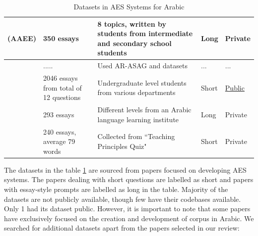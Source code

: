 \documentclass{article}
\begin{document}
\begin{table}
\begin{tabularx}{7in}{|c|X|p{1.5in}|p{1cm}|p{1.5cm}|}
			\textcite{20_azmi2019aaee} (AAEE) & 350 essays & 8 topics, written by students from intermediate and secondary school students & Long & Private \\ \hline
			\textcite{22_meccawy2023mining} & ..... & Used AR-ASAG \cite{ouahrani2020ar-asag} and \textcite{16_rababah2017short} datasets & ... & ... \\ \hline
			\textcite{23_ghazawi2024bert} & 2046 essays from total of 12 questions & Undergraduate level students from various departments & Short & \href{https://osf.io/dp2nh/?view_only=4ac6373c60214ea6952855f81507fec7}{Public} \\ \hline
			\textcite{26_alsanie2022threelevels} & 293 essays & Different levels from an Arabic language learning institute & Long & Private \\ \hline
			\textcite{27_gaheen2021jaya} & 240 essays, average 79 words & Collected from ``Teaching Principles Quiz" & Short & Private \\ \hline
		\end{tabularx}
		\caption{Datasets in AES Systems for Arabic}
		\label{arabicdatasets}
	\end{table}
	The datasets in the table \ref{arabicdatasets} are sourced from papers focused on developing AES  systems. The papers dealing with short questions are labelled as short and papers with essay-style prompts are labelled as long in the table. Majority of the datasets are not publicly available, though few have their codebases available. Only 1 had its dataset public. 
	However, it is important to note that some papers have exclusively focused on the creation and development of corpus in Arabic. We searched for additional datasets apart from the papers selected in our review:
	
	
\end{document}
